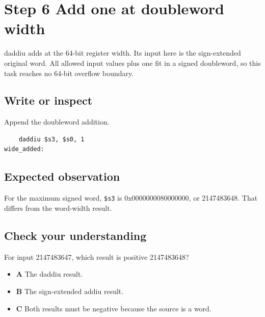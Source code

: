 \section{Step 6 Add one at doubleword
  width}\label{004-bit-inspector-s06-step-6-add-one-at-doubleword-width}

daddiu adds at the 64-bit register width. Its input here is the
sign-extended original word. All allowed input values plus one fit in a
signed doubleword, so this task reaches no 64-bit overflow boundary.

\subsection{Write or
  inspect}\label{004-bit-inspector-s06-write-or-inspect}

Append the doubleword addition.

\begin{verbatim}
    daddiu $s3, $s0, 1
wide_added:
\end{verbatim}

\subsection{Expected
  observation}\label{004-bit-inspector-s06-expected-observation}

For the maximum signed word, \texttt{\$s3} is 0x0000000080000000, or
2147483648. That differs from the word-width result.

\subsection{Check your
  understanding}\label{004-bit-inspector-s06-check-your-understanding}

For input 2147483647, which result is positive 2147483648?

\begin{itemize}
  \tightlist
  \item
        \textbf{A} The daddiu result.
  \item
        \textbf{B} The sign-extended addiu result.
  \item
        \textbf{C} Both results must be negative because the source is a word.
\end{itemize}
